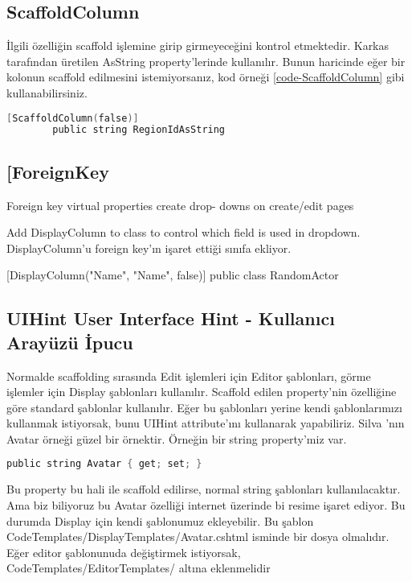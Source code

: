 \documentclass[10pt,a4paper]{article}
\begin{document}
\subsection{ScaffoldColumn }
İlgili özelliğin scaffold işlemine girip girmeyeceğini kontrol etmektedir.
Karkas tarafından üretilen AsString property'lerinde kullanılır.
Bunun haricinde eğer bir kolonun scaffold edilmesini istemiyorsanız,
kod örneği \ref{code-ScaffoldColumn} gibi kullanabilirsiniz.




\begin{lstlisting}[label=code-ScaffoldColumn,caption=ScaffoldColumn,language=C]
		[ScaffoldColumn(false)]
		public string RegionIdAsString
\end{lstlisting}


\subsection{[ForeignKey  }


		
Foreign key virtual properties create drop- downs on create/edit pages

Add DisplayColumn to class to control
which field is used in dropdown. DisplayColumn'u foreign key'ın işaret ettiği sınıfa ekliyor.

[DisplayColumn("Name", "Name", false)]
public class RandomActor


\subsection{UIHint User Interface Hint - Kullanıcı Arayüzü İpucu}

Normalde scaffolding sırasında Edit işlemleri için Editor şablonları,
görme işlemler için Display şablonları kullanılır.
Scaffold edilen property'nin özelliğine göre standard şablonlar kullanılır.
Eğer bu şablonları yerine kendi şablonlarımızı kullanmak istiyorsak,
bunu UIHint attribute'ını kullanarak yapabiliriz.
Silva \cite{Silva2010}'nın Avatar örneği güzel bir örnektir.
Örneğin bir string property'miz var.

\begin{lstlisting}[label=code-UIHintOrnek1,caption=UIHint Örnek1,language=C]
	public string Avatar { get; set; }
\end{lstlisting}

Bu property bu hali ile scaffold edilirse, normal string şablonları kullanılacaktır.
Ama biz biliyoruz bu Avatar özelliği internet üzerinde bi resime işaret ediyor.
Bu durumda Display için kendi şablonumuz ekleyebilir.
Bu şablon CodeTemplates/DisplayTemplates/Avatar.cshtml isminde bir dosya olmalıdır.
Eğer editor şablonunuda değiştirmek istiyorsak,  CodeTemplates/EditorTemplates/ altına eklenmelidir
\end{document}
